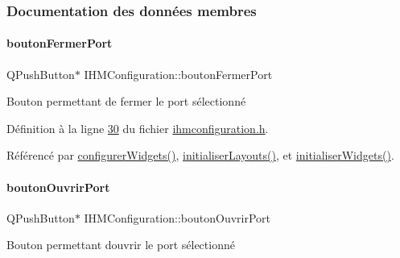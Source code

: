 \subsubsection{Documentation des données membres}
\mbox{\label{class_i_h_m_configuration_a25c0b3c51a8d162ae3439a56ec644909}} 
\paragraph{\texorpdfstring{bouton\+Fermer\+Port}{boutonFermerPort}}
{\footnotesize\ttfamily Q\+Push\+Button$\ast$ I\+H\+M\+Configuration\+::bouton\+Fermer\+Port\hspace{0.3cm}{\ttfamily [private]}}



Bouton permettant de fermer le port sélectionné 



Définition à la ligne \hyperlink{ihmconfiguration_8h_source_l00030}{30} du fichier \hyperlink{ihmconfiguration_8h_source}{ihmconfiguration.\+h}.



Référencé par \hyperlink{ihmconfiguration_8cpp_source_l00033}{configurer\+Widgets()}, \hyperlink{ihmconfiguration_8cpp_source_l00051}{initialiser\+Layouts()}, et \hyperlink{ihmconfiguration_8cpp_source_l00023}{initialiser\+Widgets()}.

\mbox{\label{class_i_h_m_configuration_a824b7f6c0d332b8f6f76801e545b14ad}} 
\paragraph{\texorpdfstring{bouton\+Ouvrir\+Port}{boutonOuvrirPort}}
{\footnotesize\ttfamily Q\+Push\+Button$\ast$ I\+H\+M\+Configuration\+::bouton\+Ouvrir\+Port\hspace{0.3cm}{\ttfamily [private]}}



Bouton permettant d\textquotesingle{}ouvrir le port sélectionné 



